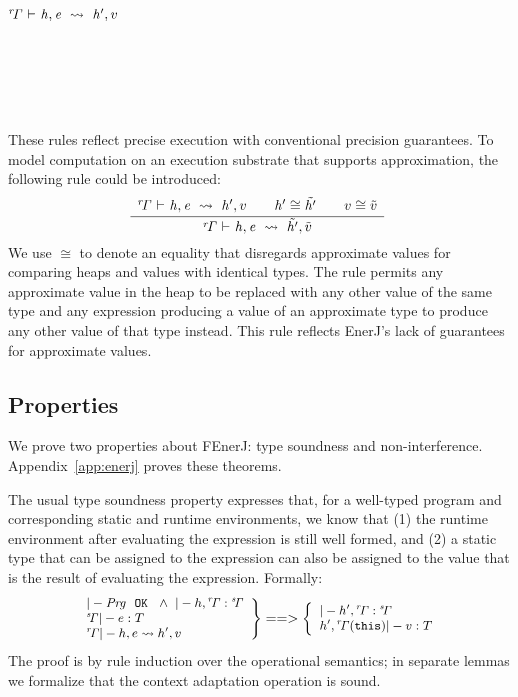 \vspace{1.0ex}
\noindent
\begin{ottdefnblock}[#1]{$ \mathit{ {^r}\!\Gamma} \  \textsf{$\vdash$} \  \mathit{h} ,  \mathit{e} \ \leadsto\  \mathit{h'} ,  v $}{}
\begin{centering}
\ottusedrule{\ottdruleosXXread{}}\\[1mm plus 1mm minus .5mm]
\ottusedrule{\ottdruleosXXwrite{}}\\[1mm plus 1mm minus .5mm]
\ottusedrule{\ottdruleosXXcondXXt{}}\\[1mm plus 1mm minus .5mm]
\ottusedrule{\ottdruleosXXcondXXf{}}\\
\end{centering}
\end{ottdefnblock}
\vspace{1.5ex}

\noindent
These rules reflect precise execution with conventional precision
guarantees.
To model computation on an execution substrate that supports approximation,
the following rule could be introduced:
%
\[
\ottdruleosXXapprox{}
\]
%
We use $\cong$ to denote an equality that disregards approximate
values for comparing heaps and values with identical types.
The rule permits any
approximate value in the heap to be replaced with any other value
of the same type
and any expression producing a value of an approximate type to
produce any other value of that type instead.
This rule reflects EnerJ's
lack of guarantees for approximate values.



\subsection{Properties}

We prove two properties about FEnerJ: type soundness and
non-interference.
Appendix~\ref{app:enerj} proves these theorems.

The usual type soundness property expresses that, for a well-typed
program and corresponding static and runtime environments, we know
that
(1) the runtime environment after evaluating the expression is still
well formed, and
(2) a static type that can be assigned to the expression can also be
assigned to the value that is the result of evaluating the expression.
Formally:
\[
\small
\left.
\begin{array}{l}
|- \mathit{Prg}\ \ \mathtt{OK}\ \ \wedge\  |- h, \mathit{^{r}\!\Gamma} : \mathit{^{s}\!\Gamma}\\
\mathit{^{s}\!\Gamma} |- e : T\\
\mathit{^{r}\!\Gamma} |- h, e \leadsto h', v\\
\end{array}
\right\} ==> \left\{
\begin{array}{l}
|- h', \mathit{^{r}\!\Gamma} : \mathit{^{s}\!\Gamma}\\
h', \mathit{^{r}\!\Gamma}(\mathtt{this}) |- v : T\\
\end{array}
\right.
\]
The proof is by rule induction over the operational semantics; in
separate lemmas we formalize that the context adaptation operation
\comb{} is sound.


